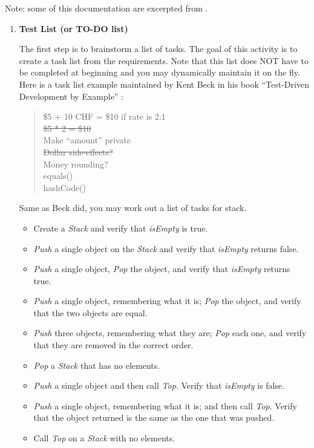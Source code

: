 Note: some of this documentation are excerpted from \cite{Newkirk:04}.
\begin{enumerate}
\item \textbf{Test List (or TO-DO list)}

The first step is to brainstorm a list of tasks. The goal of this
activity is to create a task list from the requirements. Note that
this list does NOT have to be completed at beginning and you may
dynamically maintain it on the fly. Here is a task list example
maintained by Kent Beck in his book ``Test-Driven Development by
Example'' \cite{Beck:03}:
\begin{quote}
\$5 + 10 CHF = \$10 if rate is 2:1 \\
\sout{\$5 * 2 = \$10} \\
Make ``amount'' private \\
\sout{Dollar side-effects?} \\
Money rounding? \\
equals() \\
hashCode() \\
\end{quote}

Same as Beck did, you may work out a list of tasks for stack.
\begin{itemize}
\item {Create a \textit{Stack} and verify that \textit{isEmpty} is true.}
\item {\textit{Push} a single object on the \textit{Stack} and verify that \textit{isEmpty} returns false.}
\item {\textit{Push} a single object, \textit{Pop} the object, and verify that \textit{isEmpty} returns true.}
\item {\textit{Push} a single object, remembering what it is; \textit{Pop} the object, and verify that the two objects are equal.}
\item {\textit{Push} three objects, remembering what they are; \textit{Pop} each one, and verify that they are removed in the correct order.}
\item {\textit{Pop} a \textit{Stack} that has no elements.}
\item {\textit{Push} a single object and then call \textit{Top}. Verify that \textit{isEmpty} is false.}
\item {\textit{Push} a single object, remembering what it is; and then call \textit{Top}. Verify that the object returned is the same as the one that was pushed.}
\item {Call \textit{Top} on a \textit{Stack} with no elements.}
\end{itemize}


\end{enumerate}
